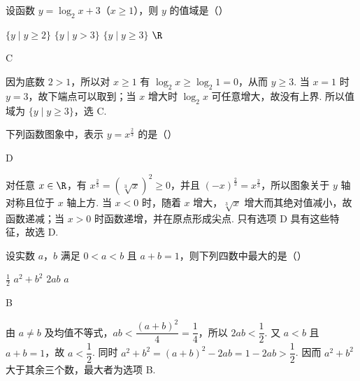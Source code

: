 \begin{problem}
设函数 \(y=\log_2 x+3\)（\(x\geqslant 1\)），则 \(y\) 的值域是（\quad）

\choices
    {\(\{y\mid y\geqslant 2\}\)}
    {\(\{y\mid y>3\}\)}
    {\(\{y\mid y\geqslant 3\}\)}
    {\(\R\)}
\end{problem}

\begin{answer}
C
\end{answer}

\begin{solution}
因为底数 \(2>1\)，所以对 \(x\geqslant1\) 有 \(\log_2x\geqslant\log_2 1=0\)，从而 \(y\geqslant3\). 当 \(x=1\) 时 \(y=3\)，故下端点可以取到；当 \(x\) 增大时 \(\log_2x\) 可任意增大，故没有上界. 所以值域为 \(\{y\mid y\geqslant3\}\)，选 C.
\end{solution}

\begin{problem}
下列函数图象中，表示 \(y=x^{\frac{2}{3}}\) 的是（\quad）

    {}
    {}
    {}
\end{problem}

\begin{answer}
D
\end{answer}

\begin{solution}
对任意 \(x\in\R\)，有 \(x^{\frac{2}{3}}=\left(\sqrt[3]{x}\right)^2\geqslant0\)，并且 \((-x)^{\frac{2}{3}}=x^{\frac{2}{3}}\)，所以图象关于 \(y\) 轴对称且位于 \(x\) 轴上方. 当 \(x<0\) 时，随着 \(x\) 增大，\(\sqrt[3]{x}\) 增大而其绝对值减小，故函数递减；当 \(x>0\) 时函数递增，并在原点形成尖点. 只有选项 D 具有这些特征，故选 D.
\end{solution}

\begin{problem}
设实数 \(a\)，\(b\) 满足 \(0<a<b\) 且 \(a+b=1\)，则下列四数中最大的是（\quad）

\choices
    {\(\frac{1}{2}\)}
    {\(a^2+b^2\)}
    {\(2ab\)}
    {\(a\)}
\end{problem}

\begin{answer}
B
\end{answer}

\begin{solution}
由 \(a\ne b\) 及均值不等式，\(ab<\dfrac{(a+b)^2}{4}=\dfrac14\)，所以 \(2ab<\dfrac12\). 又 \(a<b\) 且 \(a+b=1\)，故 \(a<\dfrac12\). 同时
\(a^2+b^2=(a+b)^2-2ab=1-2ab>\dfrac12\). 因而 \(a^2+b^2\) 大于其余三个数，最大者为选项 B.
\end{solution}

